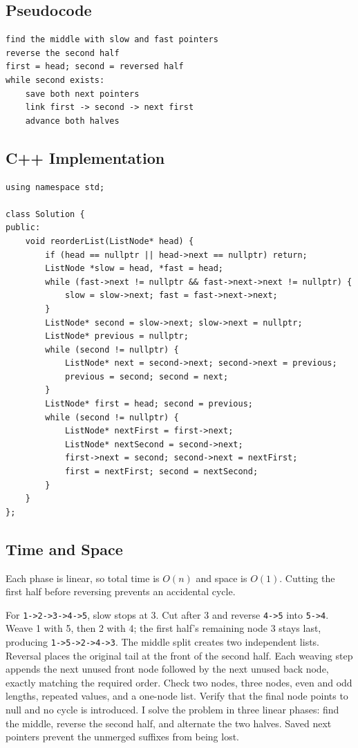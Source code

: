 \subsection{Pseudocode}
\begin{lstlisting}[style=pseudocode]
find the middle with slow and fast pointers
reverse the second half
first = head; second = reversed half
while second exists:
    save both next pointers
    link first -> second -> next first
    advance both halves
\end{lstlisting}

\subsection{C++ Implementation}
\begin{lstlisting}[style=compactcode,caption={Complete C++ solution: Reorder List}]
using namespace std;

class Solution {
public:
    void reorderList(ListNode* head) {
        if (head == nullptr || head->next == nullptr) return;
        ListNode *slow = head, *fast = head;
        while (fast->next != nullptr && fast->next->next != nullptr) {
            slow = slow->next; fast = fast->next->next;
        }
        ListNode* second = slow->next; slow->next = nullptr;
        ListNode* previous = nullptr;
        while (second != nullptr) {
            ListNode* next = second->next; second->next = previous;
            previous = second; second = next;
        }
        ListNode* first = head; second = previous;
        while (second != nullptr) {
            ListNode* nextFirst = first->next;
            ListNode* nextSecond = second->next;
            first->next = second; second->next = nextFirst;
            first = nextFirst; second = nextSecond;
        }
    }
};
\end{lstlisting}

\subsection{Time and Space}
Each phase is linear, so total time is \(O(n)\) and space is \(O(1)\). Cutting
the first half before reversing prevents an accidental cycle.

\lessonexpansion
  {For \texttt{1->2->3->4->5}, slow stops at 3. Cut after 3 and reverse
   \texttt{4->5} into \texttt{5->4}. Weave 1 with 5, then 2 with 4; the first
   half's remaining node 3 stays last, producing
   \texttt{1->5->2->4->3}.}
  {The middle split creates two independent lists. Reversal places the original
   tail at the front of the second half. Each weaving step appends the next
   unused front node followed by the next unused back node, exactly matching
   the required order.}
  {Check two nodes, three nodes, even and odd lengths, repeated values, and a
   one-node list. Verify that the final node points to null and no cycle is
   introduced.}
  {I solve the problem in three linear phases: find the middle, reverse the
   second half, and alternate the two halves. Saved next pointers prevent the
   unmerged suffixes from being lost.}

